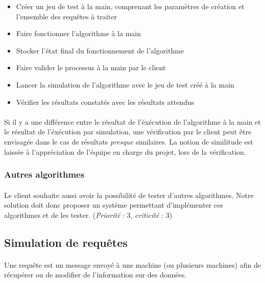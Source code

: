 \documentclass[12pt]{article}
\newcommand{\besoin}[2] {
  (\textit{Priorité} : #1, \textit{criticité} : #2)
}
\begin{document}
\begin{itemize}
	\item Créer un jeu de test à la main, comprenant les paramètres de création et l'ensemble des requêtes à traiter
	\item Faire fonctionner l'algorithme à la main
	\item Stocker l'état final du fonctionnement de l'algorithme
	\item Faire valider le processus à la main par le client
	\item Lancer la simulation de l'algorithme avec le jeu de test créé à la main
	\item Vérifier les résultats constatés avec les résultats attendus
\end{itemize}
	
\paragraph{} Si il y a une différence entre le résultat de l'éxécution de l'algorithme à la main et le résultat de l'éxécution par simulation, une vérification par le client peut être envisagée dans le cas de résultats \textit{presque} similaires. 
La notion de similitude est laissée à l'appréciation de l'équipe en charge du projet, lors de la vérification.


\subsubsection{Autres algorithmes}

\paragraph{} Le client souhaite aussi avoir la possibilité de tester d'autres algorithmes. 
Notre solution doit donc proposer un système permettant d'implémenter ces algorithmes et de les tester. \besoin{3}{3} 


\subsection{Simulation de requêtes}

\paragraph{} Une requête est un message envoyé à une machine (ou plusieurs machines) afin de récupérer ou de modifier de l'information sur des données.
\end{document}
